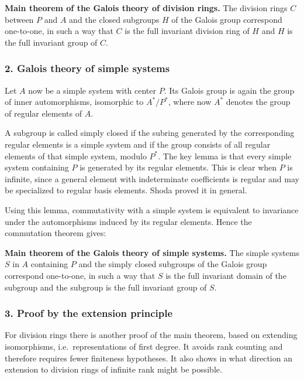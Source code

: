 \documentclass[
  11pt,
]{article}
\begin{document}
\textbf{Main theorem of the Galois theory of division rings.} The
division rings \(C\) between \(P\) and \(A\) and the closed subgroups
\(H\) of the Galois group correspond one-to-one, in such a way that
\(C\) is the full invariant division ring of \(H\) and \(H\) is the full
invariant group of \(C\).

\subsubsection{2. Galois theory of simple
systems}\label{galois-theory-of-simple-systems-1}

Let \(A\) now be a simple system with center \(P\). Its Galois group is
again the group of inner automorphisms, isomorphic to \(A^*/P^*\), where
now \(A^*\) denotes the group of regular elements of \(A\).

A subgroup is called simply closed if the subring generated by the
corresponding regular elements is a simple system and if the group
consists of all regular elements of that simple system, modulo \(P^*\).
The key lemma is that every simple system containing \(P\) is generated
by its regular elements. This is clear when \(P\) is infinite, since a
general element with indeterminate coefficients is regular and may be
specialized to regular basis elements. Shoda proved it in general.

Using this lemma, commutativity with a simple system is equivalent to
invariance under the automorphisms induced by its regular elements.
Hence the commutation theorem gives:

\textbf{Main theorem of the Galois theory of simple systems.} The simple
systems \(S\) in \(A\) containing \(P\) and the simply closed subgroups
of the Galois group correspond one-to-one, in such a way that \(S\) is
the full invariant domain of the subgroup and the subgroup is the full
invariant group of \(S\).

\subsubsection{3. Proof by the extension
principle}\label{proof-by-the-extension-principle}

For division rings there is another proof of the main theorem, based on
extending isomorphisms, i.e.~representations of first degree. It avoids
rank counting and therefore requires fewer finiteness hypotheses. It
also shows in what direction an extension to division rings of infinite
rank might be possible.
\end{document}
